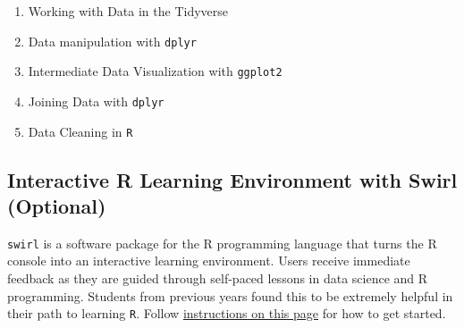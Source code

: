 \documentclass[letterpaper,12pt,twoside,]{pinp}
\providecommand{\tightlist}{%
  \setlength{\itemsep}{0pt}\setlength{\parskip}{0pt}}
\begin{document}
\begin{enumerate}
\def\labelenumi{\arabic{enumi}.}
\tightlist
\item
  Working with Data in the Tidyverse
\item
  Data manipulation with \texttt{dplyr}
\item
  Intermediate Data Visualization with \texttt{ggplot2}
\item
  Joining Data with \texttt{dplyr}
\item
  Data Cleaning in \texttt{R}
\end{enumerate}

\hypertarget{interactive-r-learning-environment-with-swirl-optional}{%
\subsection{Interactive R Learning Environment with Swirl
(Optional)}\label{interactive-r-learning-environment-with-swirl-optional}}

\texttt{swirl} is a software package for the R programming language that
turns the R console into an interactive learning environment. Users
receive immediate feedback as they are guided through self-paced lessons
in data science and R programming. Students from previous years found
this to be extremely helpful in their path to learning \texttt{R}.
Follow \href{https://swirlstats.com/students.html}{instructions on this
page} for how to get started.

\end{document}
